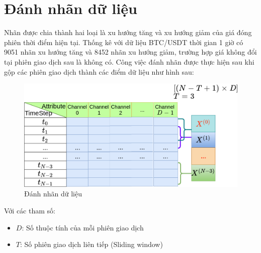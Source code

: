 \section{Đánh nhãn dữ liệu} \label{data-labeling}
Nhãn được chia thành hai loại là xu hướng tăng và xu hướng giảm của giá đóng phiên thời điểm hiện tại. Thống kê với dữ liệu BTC/USDT thời gian 1 giờ có 9051 nhãn xu hướng tăng và 8452 nhãn xu hướng giảm, trường hợp giá không đổi tại phiên giao dịch sau là không có. Công việc đánh nhãn được thực hiện sau khi gộp các phiên giao dịch thành các điểm dữ liệu như hình sau:
\begin{figure}[hbt!]
    \centering
	\includegraphics[width=.8\textwidth]{figures/labeling.png}
	\caption{Đánh nhãn dữ liệu}
	\label{fig:Labeling}

\end{figure}


Với các tham số:
\begin{itemize}
    \item $D$: Số thuộc tính của mỗi phiên giao dịch
    \item $T$: Số phiên giao dịch liên tiếp (Sliding window)
\end{itemize}




